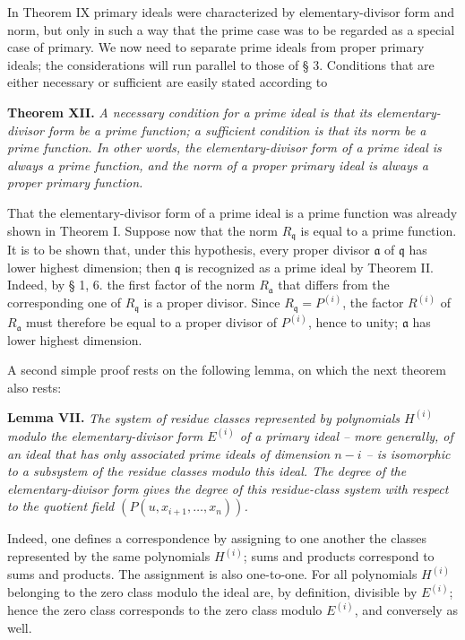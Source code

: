 \documentclass[11pt]{article}
\providecommand{\frakq}{\mathfrak q}
\providecommand{\fraka}{\mathfrak a}
\providecommand{\fraka}{\mathfrak a}
\providecommand{\frakq}{\mathfrak q}
\begin{document}
In Theorem IX primary ideals were characterized by elementary-divisor form and norm, but only in such a way that the prime case was to be regarded as a special case of primary. We now need to separate prime ideals from proper primary ideals; the considerations will run parallel to those of § 3. Conditions that are either necessary or sufficient are easily stated according to

\textbf{Theorem XII.} \emph{A necessary condition for a prime ideal is that its elementary-divisor form be a prime function; a sufficient condition is that its norm be a prime function. In other words, the elementary-divisor form of a prime ideal is always a prime function, and the norm of a proper primary ideal is always a proper primary function.}

That the elementary-divisor form of a prime ideal is a prime function was already shown in Theorem I. Suppose now that the norm $R_\frakq$ is equal to a prime function. It is to be shown that, under this hypothesis, every proper divisor $\fraka$ of $\frakq$ has lower highest dimension; then $\frakq$ is recognized as a prime ideal by Theorem II. Indeed, by § 1, 6. the first factor of the norm $R_\fraka$ that differs from the corresponding one of $R_\frakq$ is a proper divisor. Since $R_\frakq=P^{(i)}$, the factor $R^{(i)}$ of $R_\fraka$ must therefore be equal to a proper divisor of $P^{(i)}$, hence to unity; $\fraka$ has lower highest dimension.

A second simple proof rests on the following lemma, on which the next theorem also rests:

\textbf{Lemma VII.} \emph{The system of residue classes represented by polynomials $H^{(i)}$ modulo the elementary-divisor form $E^{(i)}$ of a primary ideal -- more generally, of an ideal that has only associated prime ideals of dimension $n-i$ -- is isomorphic to a subsystem of the residue classes modulo this ideal. The degree of the elementary-divisor form gives the degree of this residue-class system with respect to the quotient field $(P(u,x_{i+1},\ldots,x_n))$.}

Indeed, one defines a correspondence by assigning to one another the classes represented by the same polynomials $H^{(i)}$; sums and products correspond to sums and products. The assignment is also one-to-one. For all polynomials $H^{(i)}$ belonging to the zero class modulo the ideal are, by definition, divisible by $E^{(i)}$; hence the zero class corresponds to the zero class modulo $E^{(i)}$, and conversely as well.
\end{document}
